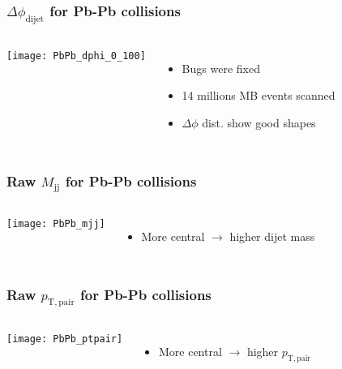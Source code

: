 \begin{frame}
\frametitle{$\Delta \phi_\mathrm{dijet}$ for Pb-Pb collisions}
\begin{columns}[c]
\centering
\texttt{[image: PbPb\_dphi\_0\_100]}\\
\begin{itemize}
\item Bugs were fixed
\item 14 millions MB events scanned
\item $\Delta \phi$ dist. show good shapes
\end{itemize}
\end{columns}
\end{frame}

\begin{frame}
\frametitle{Raw $M_\mathrm{jj}$ for Pb-Pb collisions}
\begin{columns}[c]
\centering
\texttt{[image: PbPb\_mjj]}\\
\begin{itemize}
\item More central $\rightarrow$ higher dijet mass
\end{itemize}
\end{columns}
\end{frame}

\begin{frame}
\frametitle{Raw $p_\mathrm{T,pair}$ for Pb-Pb collisions}
\begin{columns}[c]
\centering
\texttt{[image: PbPb\_ptpair]}\\
\begin{itemize}
\item More central $\rightarrow$ higher $p_\mathrm{T,pair}$
\end{itemize}
\end{columns}
\end{frame}


